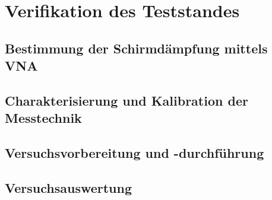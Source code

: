 
\chapter{Verifikation des Teststandes}\label{cha:4}


\section{Bestimmung der Schirmdämpfung mittels VNA}\label{cha:4_Allgemeines}




\section{Charakterisierung und Kalibration der Messtechnik}\label{cha:4_Kalibration_Messtechnik}






    
    
    
    
    
    
\section{Versuchsvorbereitung und -durchführung}\label{cha:4_Versuchsvorbereitung_und_Durchfuehrung}






\section{Versuchsauswertung}\label{cha:4_Auswertung}

